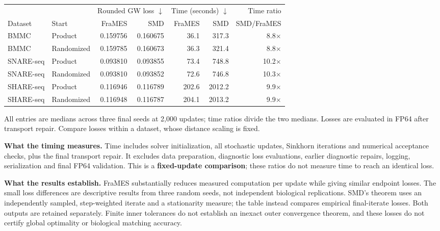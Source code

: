\documentclass[11pt,a4paper]{article}
\begin{document}
\vspace{1pt}
\begin{center}
\small
\setlength{\tabcolsep}{5pt}
\renewcommand{\arraystretch}{1.14}
\begin{tabular}{@{}llrrrrr@{}}
\toprule
& & \multicolumn{2}{c}{Rounded GW loss $\downarrow$} & \multicolumn{2}{c}{Time (seconds) $\downarrow$} & Time ratio\\
\cmidrule(lr){3-4}\cmidrule(lr){5-6}
Dataset & Start & FraMES & SMD & FraMES & SMD & SMD/FraMES\\
\midrule
BMMC & Product & 0.159756 & 0.160675 & 36.1 & 317.3 & 8.8$\times$ \\
BMMC & Randomized & 0.159785 & 0.160673 & 36.3 & 321.4 & 8.8$\times$ \\
\addlinespace[3pt]
SNARE-seq & Product & 0.093810 & 0.093855 & 73.4 & 748.8 & 10.2$\times$ \\
SNARE-seq & Randomized & 0.093810 & 0.093852 & 72.6 & 746.8 & 10.3$\times$ \\
\addlinespace[3pt]
SHARE-seq & Product & 0.116946 & 0.116789 & 202.6 & 2012.2 & 9.9$\times$ \\
SHARE-seq & Randomized & 0.116948 & 0.116787 & 204.1 & 2013.2 & 9.9$\times$ \\
\bottomrule
\end{tabular}
\end{center}
\vspace{-4pt}
{\small All entries are medians across three final seeds at 2,000 updates; time ratios divide the two medians. Losses are evaluated in FP64 after transport repair. Compare losses within a dataset, whose distance scaling is fixed.}

\textbf{What the timing measures.} Time includes solver initialization, all stochastic updates, Sinkhorn iterations and numerical acceptance checks, plus the final transport repair. It excludes data preparation, diagnostic loss evaluations, earlier diagnostic repairs, logging, serialization and final FP64 validation. This is a \textbf{fixed-update comparison}; these ratios do not measure time to reach an identical loss.

\textbf{What the results establish.} FraMES substantially reduces measured computation per update while giving similar endpoint losses. The small loss differences are descriptive results from three random seeds, not independent biological replications. SMD's theorem uses an independently sampled, step-weighted iterate and a stationarity measure; the table instead compares empirical final-iterate losses. Both outputs are retained separately. Finite inner tolerances do not establish an inexact outer convergence theorem, and these losses do not certify global optimality or biological matching accuracy.
\end{document}

